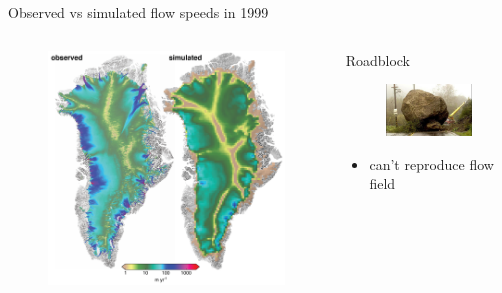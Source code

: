 \documentclass[hide notes,intlimits]{beamer}
\begin{document}
\begin{frame}{Observed vs simulated flow speeds in 1999}
  \begin{columns}[c]
    \begin{column}{.65\linewidth}
      \begin{figure}
        \includegraphics[width=\textwidth]{gris-obs-exp-old-1999}
      \end{figure}
    \end{column}
    \begin{column}{.35\linewidth}
      \begin{block}{Roadblock}
        \begin{figure}
          \includegraphics[width=\textwidth]{roadblocks}
        \end{figure}
        \begin{itemize}
        \item can't reproduce flow field
        \end{itemize}
      \end{block}
    \end{column}
  \end{columns}
\end{frame}
\end{document}
